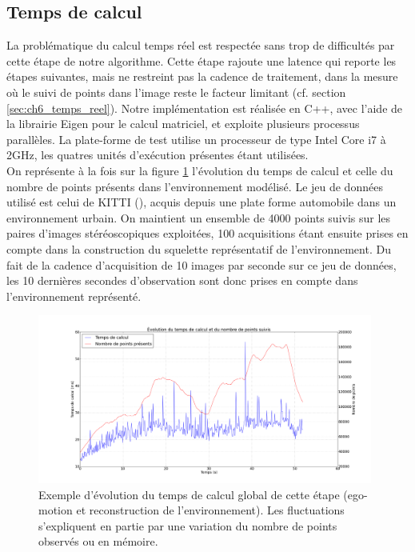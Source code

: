 \subsection{Temps de calcul} \label{sec:ch4_temps_de_calcul}
La problématique du calcul temps réel est respectée sans trop de difficultés par cette étape de notre algorithme. Cette étape rajoute une latence qui reporte les étapes suivantes, mais ne restreint pas la cadence de traitement, dans la mesure où le suivi de points dans l'image reste le facteur limitant (cf. section \ref{sec:ch6_temps_reel}). Notre implémentation est réalisée en C++, avec l'aide de la librairie Eigen pour le calcul matriciel, et exploite plusieurs processus parallèles. La plate-forme de test utilise un processeur de type Intel Core i7 à 2GHz, les quatres unités d'exécution présentes étant utilisées.\\
On représente à la fois sur la figure \ref{fig:ch4_temps_de_calcul} l'évolution du temps de calcul et celle du nombre de points présents dans l'environnement modélisé. Le jeu de données utilisé est celui de KITTI (\cite{Geiger2012}), acquis depuis une plate forme automobile dans un environnement urbain. On maintient un ensemble de 4000 points suivis sur les paires d'images stéréoscopiques exploitées, 100 acquisitions étant ensuite prises en compte dans la construction du squelette représentatif de l'environnement. Du fait de la cadence d'acquisition de 10 images par seconde sur ce jeu de données, les 10 dernières secondes d'observation sont donc prises en compte dans l'environnement représenté.\\

\begin{figure}[h] 
	\centering
	\includegraphics[width=0.98\textwidth]{Chapter4/graphics/computing_time.png}
	\caption{Exemple d'évolution du temps de calcul global de cette étape (ego-motion et reconstruction de l'environnement). Les fluctuations s'expliquent en partie par une variation du nombre de points observés ou en mémoire.}
	\label{fig:ch4_temps_de_calcul}
\end{figure}

